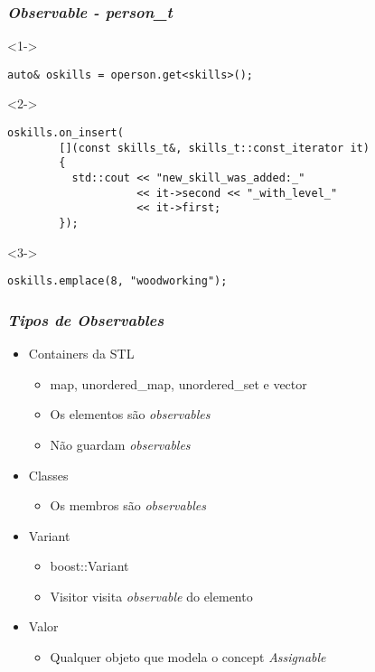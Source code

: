 \documentclass[t]{beamer}
\begin{document}
\begin{frame}[fragile]
  \frametitle{\textit{Observable - person\_t}}

  \begin{onlyenv}<1->
  \begin{lstlisting}[basicstyle=\small]
    auto& oskills = operson.get<skills>();
  \end{lstlisting}
  \end{onlyenv}

  \begin{onlyenv}<2->
  \begin{lstlisting}[basicstyle=\small]
    oskills.on_insert(
        [](const skills_t&, skills_t::const_iterator it)
        {
          std::cout << "new_skill_was_added:_"
                    << it->second << "_with_level_"
                    << it->first;
        });
  \end{lstlisting}
  \end{onlyenv}

  \begin{onlyenv}<3->
  \begin{lstlisting}[basicstyle=\small]
    oskills.emplace(8, "woodworking");
  \end{lstlisting}
  \end{onlyenv}
\end{frame}

\begin{frame}[fragile]
  \frametitle{\textit{Tipos de \textit{Observables}}}
  \begin{itemize}
    \item<1->{Containers da STL}
      \begin{itemize}
      \item<1->{map, unordered\_map, unordered\_set e vector}
      \item<2->{Os elementos são \textit{observables}}
      \item<3->{Não guardam \textit{observables}}
      \end{itemize}
    \item<4->{Classes}
      \begin{itemize}
      \item<4->{Os membros são \textit{observables}}
      \end{itemize}
    \item<5->{Variant}
      \begin{itemize}
      \item<5->{boost::Variant}
      \item<6->{Visitor visita \textit{observable} do elemento}
      \end{itemize}
    \item<7->{Valor}
      \begin{itemize}
      \item<7->{Qualquer objeto que modela o concept \textit{Assignable}}
      \end{itemize}
  \end{itemize}
\end{frame}
\end{document}
